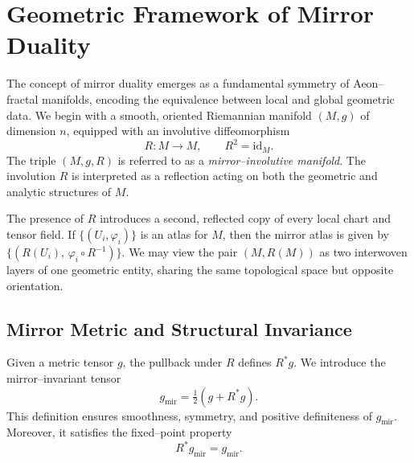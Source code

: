 
\section{Geometric Framework of Mirror Duality}\relax \hspace{0pt}

The concept of mirror duality emerges as a fundamental symmetry of
Aeon–fractal manifolds, encoding the equivalence between
local and global geometric data.
We begin with a smooth, oriented Riemannian manifold
\((M,g)\) of dimension \(n\),
equipped with an involutive diffeomorphism
\begin{equation}
R : M \longrightarrow M, \qquad R^{2}=\mathrm{id}_M.
\end{equation}
The triple \((M,g,R)\) is referred to as a 
\emph{mirror–involutive manifold}.
The involution \(R\) is interpreted as a reflection acting on
both the geometric and analytic structures of \(M\).

The presence of \(R\) introduces a second, reflected copy
of every local chart and tensor field.
If \(\{(U_i,\varphi_i)\}\) is an atlas for \(M\),
then the mirror atlas is given by 
\(\{(R(U_i),\,\varphi_i\circ R^{-1})\}\).
We may view the pair \((M,R(M))\)
as two interwoven layers of one geometric entity,
sharing the same topological space but opposite orientation.

\subsection{Mirror Metric and Structural Invariance}\relax \hspace{0pt}

Given a metric tensor \(g\),
the pullback under \(R\) defines \(R^{*}g\).
We introduce the mirror–invariant tensor
\begin{equation}
g_{\mathrm{mir}}=\tfrac{1}{2}(g+R^{*}g).
\end{equation}
This definition ensures smoothness, symmetry,
and positive definiteness of \(g_{\mathrm{mir}}\).
Moreover, it satisfies the fixed–point property
\begin{equation}
R^{*}g_{\mathrm{mir}}=g_{\mathrm{mir}}.
\end{equation}

